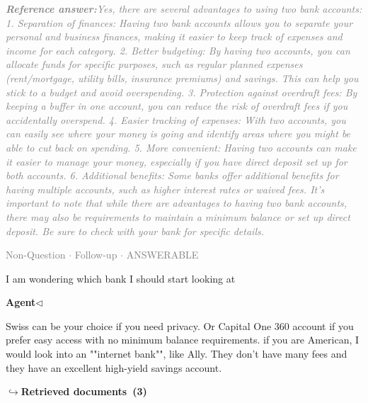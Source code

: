 \documentclass[a4paper,11pt]{article}
\begin{document}
\begin{refanswerenv}
{\footnotesize\textit{\textcolor{gray}{\textbf{Reference answer:}\enspace Yes, there are several advantages to using two bank accounts:
1. Separation of finances: Having two bank accounts allows you to separate your personal and business finances, making it easier to keep track of expenses and income for each category.
2. Better budgeting: By having two accounts, you can allocate funds for specific purposes, such as regular planned expenses (rent/mortgage, utility bills, insurance premiums) and savings. This can help you stick to a budget and avoid overspending.
3. Protection against overdraft fees: By keeping a buffer in one account, you can reduce the risk of overdraft fees if you accidentally overspend.
4. Easier tracking of expenses: With two accounts, you can easily see where your money is going and identify areas where you might be able to cut back on spending.
5. More convenient: Having two accounts can make it easier to manage your money, especially if you have direct deposit set up for both accounts.
6. Additional benefits: Some banks offer additional benefits for having multiple accounts, such as higher interest rates or waived fees.
It's important to note that while there are advantages to having two bank accounts, there may also be requirements to maintain a minimum balance or set up direct deposit. Be sure to check with your bank for specific details.}}}
\end{refanswerenv}
\vspace{0.5em}
\hfill{\tiny\textcolor{gray}{Non-Question $\cdot$ Follow-up $\cdot$ ANSWERABLE}}
\begin{userbubble}
I am wondering which bank I should start looking at
\end{userbubble}
\noindent\hfill{\small\textcolor{agentcolor}{\textbf{Agent\enspace$\triangleleft$}}}
\begin{agentbubble}
Swiss can be your choice if you need privacy. Or Capital One 360 account if you prefer easy access with no minimum balance requirements. if you are American, I would look into an ""internet bank"", like Ally. They don't have many fees and they have an excellent high-yield savings account.
\end{agentbubble}
\noindent\hfill{\footnotesize\textcolor{doccolor}{\textbf{$\hookrightarrow$\enspace Retrieved documents~(3)}}}
\end{document}
